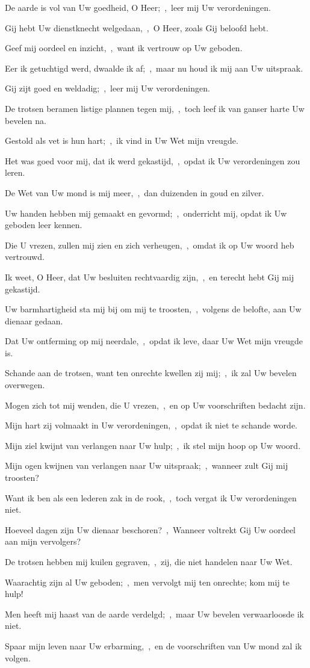 \documentclass[12pt,twoside,a5paper]{article}
\begin{document}
\begin{halfparskip}
  De aarde is vol van Uw goedheid, O Heer;~\sep\ leer mij Uw verordeningen.

   Gij hebt Uw dienstknecht welgedaan,~\sep\ O Heer, zoals Gij beloofd hebt.

  Geef mij oordeel en inzicht,~\sep\ want ik vertrouw op Uw geboden.

  Eer ik getuchtigd werd, dwaalde ik af;~\sep\ maar nu houd ik mij aan Uw uitspraak.

  Gij zijt goed en weldadig;~\sep\ leer mij Uw verordeningen.

  De trotsen beramen listige plannen tegen mij,~\sep\ toch leef ik van ganser harte Uw bevelen na.

  Gestold als vet is hun hart;~\sep\ ik vind in Uw Wet mijn vreugde.

  Het was goed voor mij, dat ik werd gekastijd,~\sep\ opdat ik Uw verordeningen zou leren.

  De Wet van Uw mond is mij meer,~\sep\ dan duizenden in goud en zilver.

   Uw handen hebben mij gemaakt en gevormd;~\sep\ onderricht mij, opdat ik Uw geboden leer kennen.

  Die U vrezen, zullen mij zien en zich verheugen,~\sep\ omdat ik op Uw woord heb vertrouwd.

  Ik weet, O Heer, dat Uw besluiten rechtvaardig zijn,~\sep\ en terecht hebt Gij mij gekastijd.

  Uw barmhartigheid sta mij bij om mij te troosten,~\sep\ volgens de belofte, aan Uw dienaar gedaan.

  Dat Uw ontferming op mij neerdale,~\sep\ opdat ik leve, daar Uw Wet mijn vreugde is.

  Schande aan de trotsen, want ten onrechte kwellen zij mij;~\sep\ ik zal Uw bevelen overwegen.

  Mogen zich tot mij wenden, die U vrezen,~\sep\ en op Uw voorschriften bedacht zijn.

  Mijn hart zij volmaakt in Uw verordeningen,~\sep\ opdat ik niet te schande worde.

   Mijn ziel kwijnt van verlangen naar Uw hulp;~\sep\ ik stel mijn hoop op Uw woord.

  Mijn ogen kwijnen van verlangen naar Uw uitspraak;~\sep\ wanneer zult Gij mij troosten?

  Want ik ben als een lederen zak in de rook,~\sep\ toch vergat ik Uw verordeningen niet.

  Hoeveel dagen zijn Uw dienaar beschoren?~\sep\ Wanneer voltrekt Gij Uw oordeel aan mijn vervolgers?

  De trotsen hebben mij kuilen gegraven,~\sep\ zij, die niet handelen naar Uw Wet.

  Waarachtig zijn al Uw geboden;~\sep\ men vervolgt mij ten onrechte; kom mij te hulp!

  Men heeft mij haast van de aarde verdelgd;~\sep\ maar Uw bevelen verwaarloosde ik niet.

  Spaar mijn leven naar Uw erbarming,~\sep\ en de voorschriften van Uw mond zal ik volgen.
\end{halfparskip}
\end{document}
